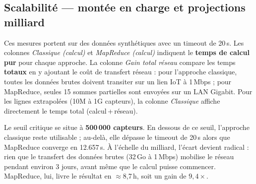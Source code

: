 \documentclass[12pt,a4paper]{article}
\begin{document}
\subsection{Scalabilité — montée en charge et projections milliard}

Ces mesures portent sur des données synthétiques avec un timeout de 20\,s.
Les colonnes \textit{Classique (calcul)} et \textit{MapReduce (calcul)} indiquent
le \textbf{temps de calcul pur} pour chaque approche. La colonne \textit{Gain total réseau}
compare les temps \textbf{totaux} en y ajoutant le coût de transfert réseau : pour
l'approche classique, toutes les données brutes doivent transiter sur un lien IoT à
1\,Mbps ; pour MapReduce, seules 15 sommes partielles sont envoyées sur un LAN Gigabit.
Pour les lignes extrapolées (10M à 1G capteurs), la colonne \textit{Classique} affiche
directement le temps total (calcul\,+\,réseau).

\begin{center}
\small
{}
\end{center}

\noindent Le seuil critique se situe à \textbf{500\,000 capteurs}. En dessous de ce
seuil, l'approche classique reste utilisable ; au-delà, elle dépasse le timeout de 20\,s
alors que MapReduce converge en 12.657\,s. À l'échelle du milliard, l'écart devient
radical : rien que le transfert des données brutes (32\,Go à 1\,Mbps) mobilise le réseau
pendant environ 3 jours, avant même que le calcul puisse commencer. MapReduce, lui,
livre le résultat en $\approx$8,7\,h, soit un gain de $9{,}4\times$.
\end{document}
